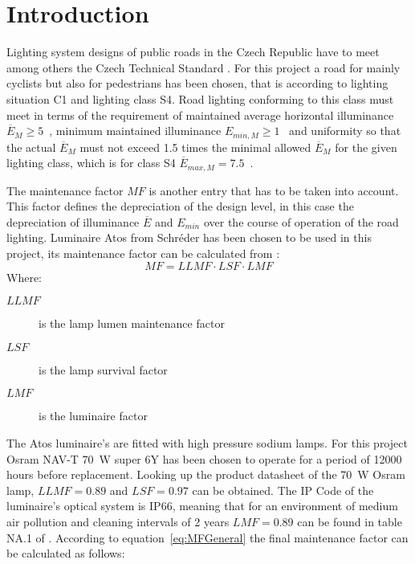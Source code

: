 \section{Introduction}
\label{sec:Road_Lighting_Design}
Lighting system designs of public roads in the Czech Republic have to meet among others the Czech Technical Standard \cite{CSN_EN_13201-2}. For this project a road for mainly cyclists but also for pedestrians has been chosen, that is according to \cite{CSN_EN_13201-1} lighting situation C1 and lighting class S4. Road lighting conforming to this class must meet in terms of \cite{CSN_EN_13201-2} the requirement of maintained average horizontal illuminance $\overline{E}_{M}\geq 5$~, minimum maintained illuminance $E_{min,M}\geq 1$~ and uniformity so that the actual $\overline{E}_{M}$ must not exceed 1.5 times the minimal allowed $\overline{E}_{M}$ for the given lighting class, which is for class S4 $\overline{E}_{max,M} = 7.5$~.

The maintenance factor $MF$ is another entry that has to be taken into account. This factor defines the depreciation of the design level, in this case the depreciation of illuminance $\overline{E}$ and $E_{min}$ over the course of operation of the road lighting. Luminaire Atos from Schr\'{e}der has been chosen to be used in this project, its maintenance factor can be calculated from \cite{CSN_EN_13201-2_Z1}:
\begin{equation}
\label{eq:MFGeneral}
MF = LLMF \cdot LSF \cdot LMF
\end{equation}
Where:
\begin{description}
	\item[$LLMF$] is the lamp lumen maintenance factor
	\item[$LSF$] is the lamp survival factor
	\item[$LMF$] is the luminaire factor
\end{description}

The Atos luminaire's are fitted with high pressure sodium lamps. For this project Osram NAV-T 70~W super 6Y has been chosen to operate for a period of 12000 hours before replacement. Looking up the product datasheet \cite{Osram} of the 70~W Osram lamp, $LLMF=0.89$ and $LSF=0.97$ can be obtained. The IP Code of the luminaire's optical system is IP66, meaning that for an environment of medium air pollution and cleaning intervals of 2 years $LMF=0.89$ can be found in table NA.1 of \cite{CSN_EN_13201-2_Z1}. According to equation~\ref{eq:MFGeneral} the final maintenance factor can be calculated as follows:

